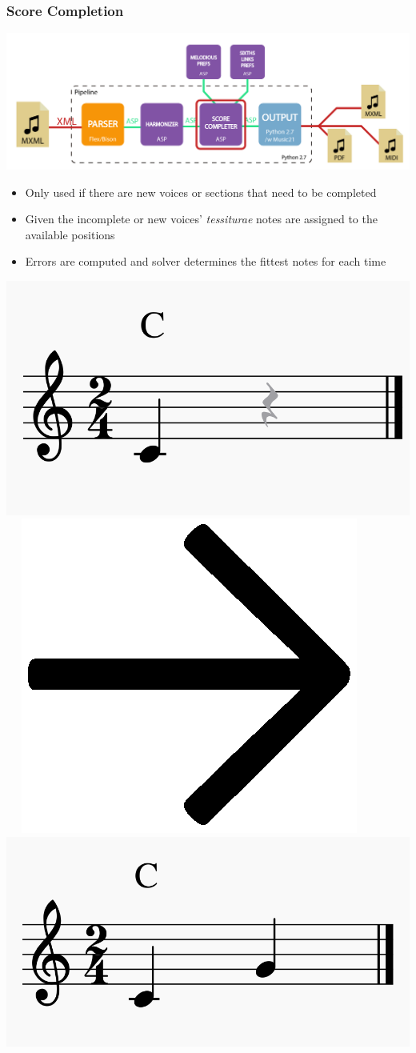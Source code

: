 \documentclass[english,fragile]{beamer}
\begin{document}
	\begin{frame}[t,fragile]
	\frametitle{Score Completion}
	\begin{center}
			\includegraphics[width=0.6\linewidth]{imagenes/arch_trans/arquitectura_final_asp_comp-01.png}
			\end{center}
	\begin{itemize}
		\item Only used if there are \alert{new voices or sections} that need to be completed
		\pause
		\item Given the incomplete or new voices' \textit{tessiturae} \alert{notes are assigned} to the available positions
		\pause
		\item \alert{Errors} are computed and solver determines the \alert{fittest notes} for each time
	\end{itemize}
		\begin{center}
				\includegraphics[width=0.25\linewidth,valign=c]{imagenes/incomplete_score.png}~~
				\includegraphics[width=0.04\linewidth,valign=c]{imagenes/arrow.png}~~
				\includegraphics[width=0.25\linewidth,valign=c]{imagenes/completed_score.png}
		\end{center}
\end{frame}
\end{document}
